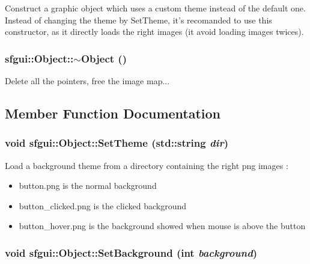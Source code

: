 Construct a graphic object which uses a custom theme instead of the default one. Instead of changing the theme by SetTheme, it's recomanded to use this constructor, as it directly loads the right images (it avoid loading images twices). \hypertarget{classsfgui_1_1Object_7d923592a63a854c77ce4edcb21e40ba}{
\subsubsection[$\sim$Object]{\setlength{\rightskip}{0pt plus 5cm}sfgui::Object::$\sim$Object ()}}
\label{classsfgui_1_1Object_7d923592a63a854c77ce4edcb21e40ba}




Delete all the pointers, free the image map... 

\subsection{Member Function Documentation}
\hypertarget{classsfgui_1_1Object_96e00c4db6358d27ad806c0053e343a1}{
\subsubsection[SetTheme]{\setlength{\rightskip}{0pt plus 5cm}void sfgui::Object::SetTheme (std::string {\em dir})}}
\label{classsfgui_1_1Object_96e00c4db6358d27ad806c0053e343a1}




Load a background theme from a directory containing the right png images : \begin{itemize}
\item button.png is the normal background \item button\_\-clicked.png is the clicked background \item button\_\-hover.png is the background showed when mouse is above the button \end{itemize}
\hypertarget{classsfgui_1_1Object_b3477443fde0d86be5e32f5c1dcd7b01}{
\subsubsection[SetBackground]{\setlength{\rightskip}{0pt plus 5cm}void sfgui::Object::SetBackground (int {\em background})}}
\label{classsfgui_1_1Object_b3477443fde0d86be5e32f5c1dcd7b01}




